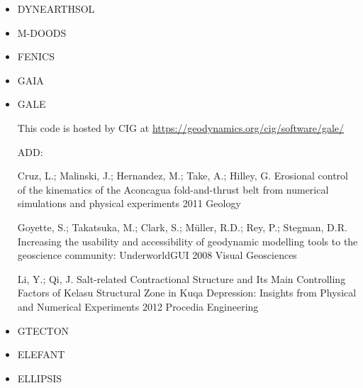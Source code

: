 \begin{itemize}
\item DYNEARTHSOL
\cite{chtl13}



\item M-DOODS
\cite{yatd12}
\cite{yahb13}

\item FENICS
\cite{alrk14}


\item GAIA

\cite{hutm13}

\item GALE

This code is hosted by CIG at \url{https://geodynamics.org/cig/software/gale/}

\cite{fabs08}
\cite{beve10}
\cite{cmwt10}
\cite{lehm12}
\cite{arbi13}

ADD:


Cruz, L.; Malinski, J.; Hernandez, M.; Take, A.; Hilley, G. 	Erosional control of the kinematics of the Aconcagua fold-and-thrust belt from numerical simulations and physical experiments 	2011 	Geology

	
Goyette, S.; Takatsuka, M.; Clark, S.; Müller, R.D.; Rey, P.; Stegman, D.R. 	Increasing the usability and accessibility of geodynamic modelling tools to the geoscience community: UnderworldGUI 	2008 	Visual Geosciences
	
Li, Y.; Qi, J. 	Salt-related Contractional Structure and Its Main Controlling Factors of Kelasu Structural Zone in Kuqa Depression: Insights from Physical and Numerical Experiments 	2012 	Procedia Engineering






\item GTECTON
\cite{gowo95}
\cite{gowo99}
\cite{bugw01}
\cite{bugw02}
\cite{gowo05}
\cite{degw06}
\cite{libi06}
\cite{bagw11}
\cite{bagw11b}
\cite{mags15}




\item ELEFANT

\cite{tosn15}
\cite{matv15}
\cite{busa16}
\cite{latb17}
\cite{thie17}
\cite{pltv18}
\cite{wohu19}

\item ELLIPSIS

\cite{modm03}
\cite{omma06} 
\cite{moql07}
\cite{dyrm07}
\cite{onlg08}
\cite{pyeg10}
\cite{legu11}
\cite{lega12}



\end{itemize}
